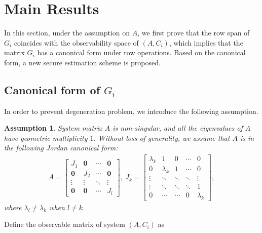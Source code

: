 \documentclass{ieeetrans}   %
\newtheorem{assumption}{\textbf{Assumption}}
\begin{document}
\section{Main Results}\label{sec:main_result}
In this section, under the assumption on $A$, we first prove that the row span of $G_i$ coincides with the observability space of $(A,C_i)$, which implies that the matrix $G_i$ has a canonical form under row operations. Based on the canonical form, a new secure estimation scheme is proposed.  


\subsection{Canonical form of $G_i$}\label{subsec:transform}
In order to prevent degeneration problem, we introduce the following assumption.
\begin{assumption}\label{as:geo_mul_1}
	System matrix $A$ is non-singular, and all the eigenvalues of $A$ have geometric multiplicity $1$. Without loss of generality, we assume that $A$ is in the following Jordan canonical form:
	\begin{align*}
		A=\begin{bmatrix}
			J_{1} & \mathbf{0} & \cdots & \mathbf{0} \\
			\mathbf{0} & J_{2} & \cdots & \mathbf{0} \\
			\vdots & \vdots & \ddots & \vdots \\
			\mathbf{0} & \mathbf{0} & \cdots & J_{l} 
		\end{bmatrix},\
		J_k=
		\begin{bmatrix}
			\lambda_{k} & 1 & 0 &  \cdots & {0} \\
			{0} & \lambda_{k} & 1 & \cdots & {0} \\
			\vdots & \ddots & \ddots   & \ddots & \vdots \\
			\vdots & \ddots & \ddots  & \ddots & 1 \\
			{0} & \cdots & \cdots & 0 & \lambda_{k} 
		\end{bmatrix},
	\end{align*}
	where $\lambda_{l}\neq\lambda_{k}$ when $l\neq k$. %
\end{assumption}
Define the observable matrix of system $(A,C_i)$ as 
\end{document}
